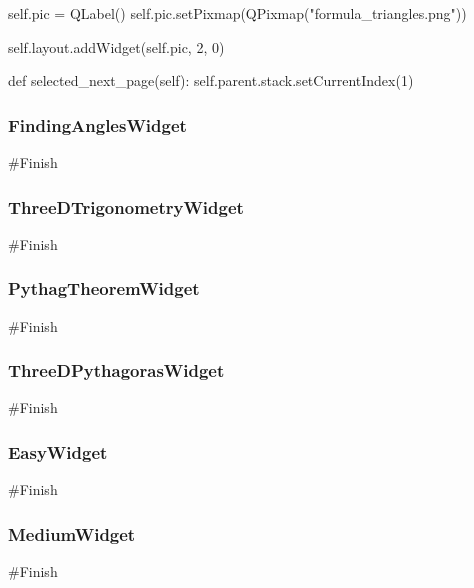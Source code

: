 \begin{landscape}
\begin{python}
        self.pic = QLabel()
        self.pic.setPixmap(QPixmap("formula_triangles.png"))

        self.layout.addWidget(self.pic, 2, 0)

    def selected_next_page(self):
        self.parent.stack.setCurrentIndex(1)
\end{python}

\subsubsection{FindingAnglesWidget}

\begin{python}
#Finish
\end{python}

\subsubsection{ThreeDTrigonometryWidget}

\begin{python}
#Finish
\end{python}

\subsubsection{PythagTheoremWidget}

\begin{python}
#Finish
\end{python}

\subsubsection{ThreeDPythagorasWidget}

\begin{python}
#Finish
\end{python}

\subsubsection{EasyWidget}

\begin{python}
#Finish
\end{python}

\subsubsection{MediumWidget}

\begin{python}
#Finish
\end{python}


\end{landscape}
